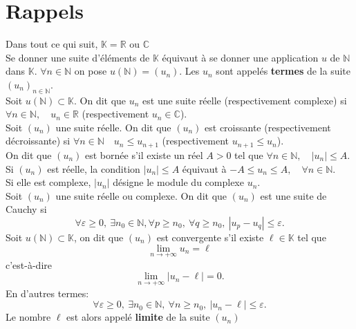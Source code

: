 \documentclass[11pt, a4paper]{book}
\begin{document}
\section{ %
Rappels}%
Dans tout ce qui suit, $\mathbb{K}= \mathbb{R}$ ou $\mathbb{C}$\\ 
Se donner une suite d'\'el\'ements de $\mathbb{K}$ \'equivaut \`a se donner une application $ u $ de $\mathbb{N}$ dans $\mathbb{K}$. $\forall n \in \mathbb{N} $ on pose $ u(\mathbb{N})=(u_{n}). $ Les $ u_{n} $ sont appel\'es \textbf{termes} de la suite $ (u_{n})_{n \in \mathbb{N} } $. \\
Soit $ u(\mathbb{N}) \subset \mathbb{K} $. On dit que $ u_{n} $ est une suite r\'eelle (respectivement complexe) si $\forall n \in \mathbb{N},\quad u_{n} \in \mathbb{R} $ (respectivement $ u_{n} \in \mathbb{C} $).\\
Soit $ (u_{n}) $ une suite r\'eelle. On dit que $ (u_{n}) $ est croissante (respectivement d\'ecroissante) si $ \forall n \in \mathbb{N} \quad u_{n}\leq u_{n+1} $ (respectivement $ u_{n+1} \leq u_{n} $).\\
On dit que $ (u_{n}) $ est born\'ee s'il existe un r\'eel $A>0$ tel que $ \forall n \in \mathbb{N} ,\quad| u_{n} | \leq A$.\\
Si $(u_{n})$ est r\'eelle, la condition $ | u_{n} | \leq A $ \'equivaut \`a $ -A \leq u_{n} \leq A,\quad \forall n \in \mathbb{N} $.\\
Si elle est complexe, $ | u_{n} | $ d\'esigne le module du complexe $ u_{n} $.\\
Soit $ (u_{n}) $ une suite r\'eelle ou complexe. On dit que $ (u_{n}) $ est une suite de Cauchy si 
$$  \forall \varepsilon \geq 0,~ \exists n_{0} \in \mathbb{N}, \forall p \geq n_{0},~ \forall q \geq n_{0},~ | u_{p}-u_{q} | \leq \varepsilon .$$
Soit $u( \mathbb{N}) \subset \mathbb{K} $,
 on dit que $ (u_{n}) $ est convergente s'il existe $ \ell \in \mathbb{K} $ tel que $$ \lim_{n \rightarrow + \infty } u_{n}= \ell $$ c'est-\`a-dire $$ \lim_{n \rightarrow +\infty } | u_{n}-\ell | = 0.$$ 
 En d'autres termes: $$ \forall \varepsilon \geq 0, ~ \exists n_{0} \in \mathbb{N}, ~ \forall n \geq n_{0},~ | u_{n}-\ell | \leq \varepsilon.$$ 
Le nombre $\ell$ est alors appel\'e \textbf{limite} de la suite $(u_{n})$\\
\end{document}
